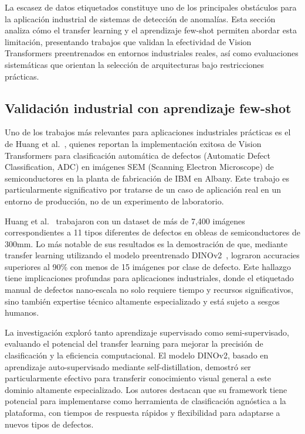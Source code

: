 La escasez de datos etiquetados constituye uno de los principales obstáculos para la aplicación industrial de sistemas de detección de anomalías. Esta sección analiza cómo el transfer learning y el aprendizaje few-shot permiten abordar esta limitación, presentando trabajos que validan la efectividad de Vision Transformers preentrenados en entornos industriales reales, así como evaluaciones sistemáticas que orientan la selección de arquitecturas bajo restricciones prácticas.

\subsection{Validación industrial con aprendizaje few-shot}

Uno de los trabajos más relevantes para aplicaciones industriales prácticas es el de Huang et al.~\cite{huang2025semiconductor}, quienes reportan la implementación exitosa de Vision Transformers para clasificación automática de defectos (Automatic Defect Classification, ADC) en imágenes SEM (Scanning Electron Microscope) de semiconductores en la planta de fabricación de IBM en Albany. Este trabajo es particularmente significativo por tratarse de un caso de aplicación real en un entorno de producción, no de un experimento de laboratorio.

Huang et al.~\cite{huang2025semiconductor} trabajaron con un dataset de más de 7,400 imágenes correspondientes a 11 tipos diferentes de defectos en obleas de semiconductores de 300mm. Lo más notable de sus resultados es la demostración de que, mediante transfer learning utilizando el modelo preentrenado DINOv2~\cite{oquab2024dinov2}, lograron accuracies superiores al 90\% con menos de 15 imágenes por clase de defecto. Este hallazgo tiene implicaciones profundas para aplicaciones industriales, donde el etiquetado manual de defectos nano-escala no solo requiere tiempo y recursos significativos, sino también expertise técnico altamente especializado y está sujeto a sesgos humanos.

La investigación exploró tanto aprendizaje supervisado como semi-supervisado, evaluando el potencial del transfer learning para mejorar la precisión de clasificación y la eficiencia computacional. El modelo DINOv2, basado en aprendizaje auto-supervisado mediante self-distillation, demostró ser particularmente efectivo para transferir conocimiento visual general a este dominio altamente especializado. Los autores destacan que su framework tiene potencial para implementarse como herramienta de clasificación agnóstica a la plataforma, con tiempos de respuesta rápidos y flexibilidad para adaptarse a nuevos tipos de defectos.


